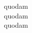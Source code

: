 \documentclass{article}
\begin{document}
\beginnumbering
\autopar

\noindent quo\hidenumbering\textbar{}dam \\
quo\textbar{}dam \\
quo\hidenumbering{}dam

\endnumbering
\end{document}
